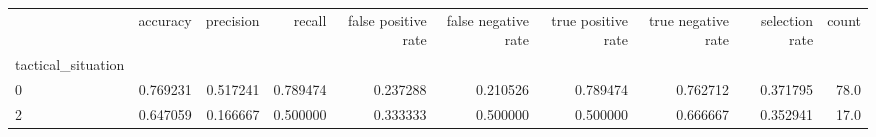 \begin{tabular}{lrrrrrrrrr}
\toprule
{} &  accuracy &  precision &    recall &  false positive rate &  false negative rate &  true positive rate &  true negative rate &  selection rate &  count \\
tactical\_situation &           &            &           &                      &                      &                     &                     &                 &        \\
\midrule
0                  &  0.769231 &   0.517241 &  0.789474 &             0.237288 &             0.210526 &            0.789474 &            0.762712 &        0.371795 &   78.0 \\
2                  &  0.647059 &   0.166667 &  0.500000 &             0.333333 &             0.500000 &            0.500000 &            0.666667 &        0.352941 &   17.0 \\
\bottomrule
\end{tabular}
